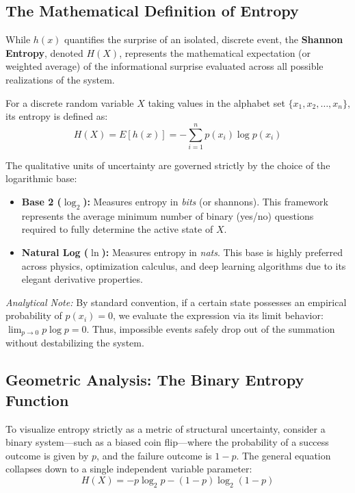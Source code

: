 \documentclass[11pt,a4paper]{article}
\begin{document}
\subsection{The Mathematical Definition of Entropy}
While $h(x)$ quantifies the surprise of an isolated, discrete event, the \textbf{Shannon Entropy}, denoted $H(X)$, represents the mathematical expectation (or weighted average) of the informational surprise evaluated across all possible realizations of the system. 

For a discrete random variable $X$ taking values in the alphabet set $\{x_1, x_2, \dots, x_n\}$, its entropy is defined as:
\begin{equation}
H(X) = E[h(x)] = -\sum_{i=1}^{n} p(x_i) \log p(x_i)
\end{equation}

The qualitative units of uncertainty are governed strictly by the choice of the logarithmic base:
\begin{itemize}
    \item \textbf{Base 2 ($\log_2$):} Measures entropy in \textit{bits} (or shannons). This framework represents the average minimum number of binary (yes/no) questions required to fully determine the active state of $X$.
    \item \textbf{Natural Log ($\ln$):} Measures entropy in \textit{nats}. This base is highly preferred across physics, optimization calculus, and deep learning algorithms due to its elegant derivative properties.
\end{itemize}
\textit{Analytical Note:} By standard convention, if a certain state possesses an empirical probability of $p(x_i) = 0$, we evaluate the expression via its limit behavior: $\lim_{p \to 0} p \log p = 0$. Thus, impossible events safely drop out of the summation without destabilizing the system.

\subsection{Geometric Analysis: The Binary Entropy Function}
To visualize entropy strictly as a metric of structural uncertainty, consider a binary system—such as a biased coin flip—where the probability of a success outcome is given by $p$, and the failure outcome is $1-p$. The general equation collapses down to a single independent variable parameter:
\begin{equation}
H(X) = -p \log_2 p - (1-p) \log_2 (1-p)
\end{equation}
\end{document}
